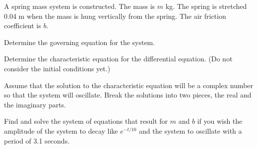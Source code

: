 \begin{problem}
\item A spring mass system is constructed. The mass is $m$ kg. The
  spring is stretched 0.04 m when the mass is hung vertically from the
  spring. The air friction coefficient is $b$.

    \begin{subproblem}
      \item Determine the governing equation for the system. 
        \vfill

      \item Determine the characteristic equation for the differential
        equation. (Do not consider the initial conditions yet.)
        \vfill

        \clearpage

      \item Assume that the solution to the characteristic equation
        will be a complex number so that the system will
        oscillate. Break the solutions into two pieces, the real and
        the imaginary parts.

        \vfill

      \item Find and solve the system of equations that result for $m$
        and $b$ if you wish the amplitude of the system to decay like
        $e^{-t/10}$ and the system to oscillate with a period of 3.1
        seconds.

        \vfill

    \end{subproblem}


\end{problem}



